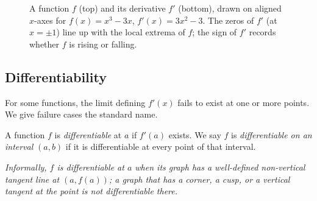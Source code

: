 \begin{figure}[H]
\centering
{}
\caption{A function \(f\) (top) and its derivative \(f'\) (bottom), drawn on aligned \(x\)-axes for \(f(x) = x^{3} - 3x\), \(f'(x) = 3x^{2} - 3\). The zeros of \(f'\) (at \(x = \pm 1\)) line up with the local extrema of \(f\); the sign of \(f'\) records whether \(f\) is rising or falling.}
\label{fig:f-and-fprime-aligned}
\end{figure}

\subsection{Differentiability}

For some functions, the limit defining \(f'(x)\) fails to exist at one or more points. We give failure cases the standard name.

\begin{definition}\label{def:differentiable}
A function \(f\) is \emph{differentiable} at \(a\) if \(f'(a)\) exists. We say \(f\) is \emph{differentiable on an interval} \((a, b)\) if it is differentiable at every point of that interval.

\emph{Informally, \(f\) is differentiable at \(a\) when its graph has a well-defined non-vertical tangent line at \((a, f(a))\); a graph that has a corner, a cusp, or a vertical tangent at the point is not differentiable there.}
\end{definition}

